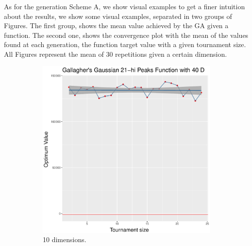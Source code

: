 As for the generation Scheme A, we show visual examples to get a finer intuition about the results, we show  some visual examples, separated in two groups of Figures. The first group, shows the mean value achieved by the GA given a function. The second one, shows the convergence plot with the mean of the values found at each generation, the function target value with a given tournament size. All Figures represent the mean of 30 repetitions given a certain dimension.


\begin{figure}[t]
	\begin{subfigure}[b]{0.33\textwidth}
		\centering
		\includegraphics[width=\textwidth]{img/multimodal_2n2n_22_dim_40.pdf}
		\caption{10 dimensions.}
	\end{subfigure}
	\begin{subfigure}[b]{0.33\textwidth}
		\centering

\end{subfigure}
\end{figure}
